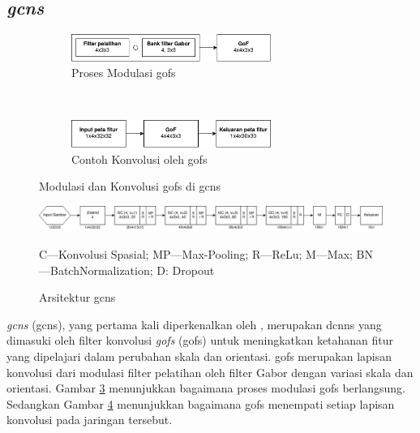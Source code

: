 \subsection{\textit{\acrlong{gcns}}}
\begin{figure}
    \centering
    \begin{subfigure}[t]{6.5cm}
        \includegraphics[width=6.5cm]{gambar/modulasi_gofs.png}
        \caption{Proses Modulasi \acrshort{gofs}}
        \label{fig:modulasigabor}
    \end{subfigure}
    ~~~
    \begin{subfigure}[t]{6.5cm}
        \includegraphics[width=6.5cm]{gambar/konvolusi_gofs.png}
        \caption{Contoh Konvolusi oleh \acrshort{gofs}}
        \label{fig:konvolusigofs}
    \end{subfigure}
    \caption[Modulasi dan Konvolusi \acrshort{gofs} di \acrshort{gcns}]{Modulasi dan Konvolusi \acrshort{gofs} di \acrshort{gcns} \protect{}}
    \label{fig:gofs}
\end{figure}
\begin{figure}[t]
    \centering
    \includegraphics[width=14cm]{gambar/gcns.png}
    \caption*{\footnotesize{C---Konvolusi Spasial; MP---Max-Pooling; R---ReLu; M---Max; BN---BatchNormalization; D: Dropout}}
    \caption[Arsitektur \acrshort{gcns}]{Arsitektur \acrshort{gcns} \protect{}}
    \label{fig:gcns}
\end{figure}
\textit{\acrlong{gcns}} (\acrshort{gcns}), yang pertama kali diperkenalkan oleh , merupakan \acrshort{dcnns} yang dimasuki oleh filter konvolusi \textit{\acrlong{gofs}} (\acrshort{gofs}) untuk meningkatkan ketahanan fitur yang dipelajari dalam perubahan skala dan orientasi. \acrshort{gofs} merupakan lapisan konvolusi dari modulasi filter pelatihan oleh filter Gabor dengan variasi skala dan orientasi. Gambar \ref{fig:gofs} menunjukkan bagaimana proses modulasi \acrshort{gofs} berlangsung. Sedangkan Gambar \ref{fig:gcns} menunjukkan bagaimana \acrshort{gofs} menempati setiap lapisan konvolusi pada jaringan tersebut.


